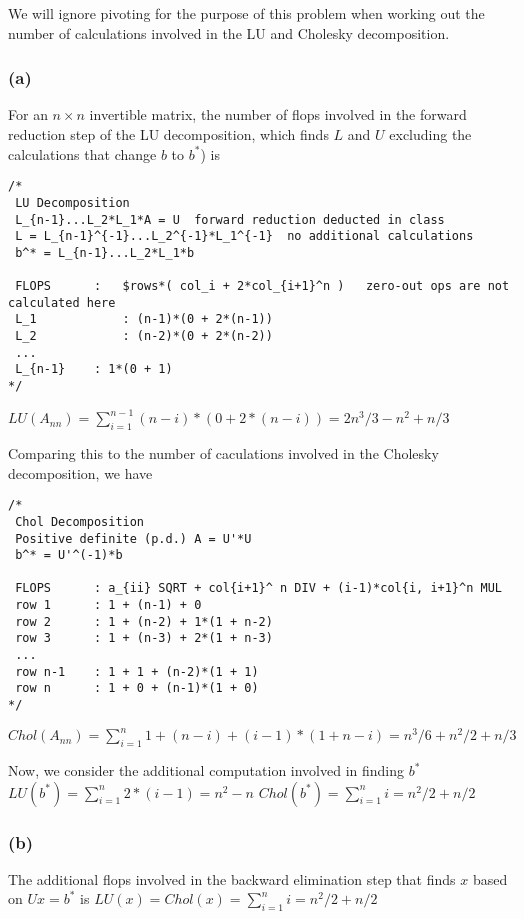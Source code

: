 \documentclass{article}
\begin{document}
We will ignore pivoting for the purpose of this problem when working out the number of calculations 
involved in the LU and Cholesky decomposition. 

\subsubsection*{(a)}
For an $n\times n$ invertible matrix, the number of flops involved in the forward reduction step of
the LU decomposition, which finds $L$ and $U$ excluding the calculations that change $b$ to $b^*$) is
\begin{lstlisting}
/* 
 LU Decomposition
 L_{n-1}...L_2*L_1*A = U  forward reduction deducted in class
 L = L_{n-1}^{-1}...L_2^{-1}*L_1^{-1}  no additional calculations
 b^* = L_{n-1}...L_2*L_1*b

 FLOPS		:	$rows*( col_i + 2*col_{i+1}^n )   zero-out ops are not calculated here
 L_1			: (n-1)*(0 + 2*(n-1))
 L_2			: (n-2)*(0 + 2*(n-2))
 ...
 L_{n-1}	: 1*(0 + 1)
*/
\end{lstlisting}
$LU(A_{nn}) = \sum_{i=1}^{n-1} (n-i)*(0+2*(n-i)) = 2n^3/3 - n^2 + n/3$

\hbox{}
Comparing this to the number of caculations involved in the Cholesky decomposition, we have
\begin{lstlisting}
/* 
 Chol Decomposition
 Positive definite (p.d.) A = U'*U
 b^* = U'^(-1)*b

 FLOPS		: a_{ii} SQRT + col{i+1}^ n DIV + (i-1)*col{i, i+1}^n MUL
 row 1		: 1 + (n-1) + 0
 row 2		: 1 + (n-2) + 1*(1 + n-2)
 row 3		: 1 + (n-3) + 2*(1 + n-3)
 ...
 row n-1	: 1 + 1 + (n-2)*(1 + 1)
 row n		: 1 + 0 + (n-1)*(1 + 0)
*/
\end{lstlisting}
$Chol(A_{nn}) = \sum_{i=1}^n 1 + (n-i) + (i-1)*(1 + n-i) = n^3/6 + n^2/2 + n/3$ 

\hbox{}
Now, we consider the additional computation involved in finding $b^*$
\newline
\hbox{}
\newline
$LU(b^*)  = \sum_{i=1}^n 2*(i-1) = n^2 - n$
\newline
$Chol(b^*)  = \sum_{i=1}^n i  = n^2/2 + n/2$


\subsubsection*{(b)}
The additional flops involved in the backward elimination step that finds $x$ based on
$Ux=b^*$ is \newline
$LU(x) = Chol(x) = \sum_{i=1}^n i  = n^2/2 + n/2$
\end{document}

